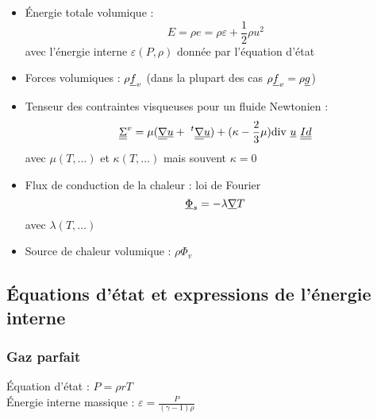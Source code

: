 \begin{itemize}

\item{Énergie totale volumique :
        \begin{equation}
        E = \rho e = \rho\varepsilon + \frac{1}{2} \rho u^2
        \end{equation}
        avec l'énergie interne $\varepsilon(P,\rho)$ donnée par l'équation d'état}
\\
\item{Forces volumiques : $\rho\underline{f}_v$ (dans la plupart des cas
                                            $\rho\underline{f}_v= \rho\underline{g}$)}
\\
\item{Tenseur des contraintes visqueuses pour un fluide Newtonien :
        \begin{equation}
        \tens{\Sigma}^v = \mu (\gradt{\vect{u}} +\ ^t\gradt{\vect{u}})
        + (\kappa - \frac{2}{3}\mu) \divs\,{\vect{u}}\ \tens{Id}
        \end{equation}
        avec $\mu(T,\ldots)$ et $\kappa(T,\ldots)$ mais souvent $\kappa =0$}
\\
\item{Flux de conduction de la chaleur : loi de Fourier
        \begin{equation}
        \underline{\Phi}_s = -\lambda \underline{\nabla}{T}
        \end{equation}
        avec $\lambda(T,\ldots)$}
\\
\item{Source de chaleur volumique : $\rho\Phi_v$}

\end{itemize}


\subsection*{Équations d'état et expressions de l'énergie interne}
\label{Cfbl_Cfbase_equations_etat_cfbase}

\subsubsection*{Gaz parfait}

Équation d'état : $P = \rho r T$\\


Énergie interne massique :
$\varepsilon = \displaystyle\frac{P}{(\gamma -1) \rho}$

